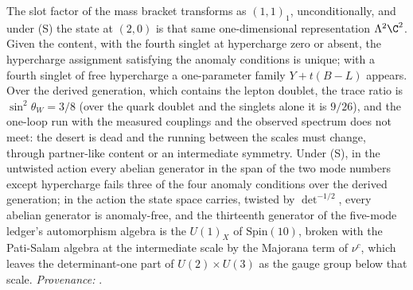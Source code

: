 The slot factor of the mass bracket transforms as $(1,1)_{1}$, unconditionally, and under (S) the state at $(2,0)$ is that same one-dimensional representation $\Lambda^{2}\C^{2}$. Given the content, with the fourth singlet at hypercharge zero or absent, the hypercharge assignment satisfying the anomaly conditions is unique; with a fourth singlet of free hypercharge a one-parameter family $Y + t(B - L)$ appears. Over the derived generation, which contains the lepton doublet, the trace ratio is $\sin^{2}\theta_{W} = 3/8$ (over the quark doublet and the singlets alone it is $9/26$), and the one-loop run with the measured couplings and the observed spectrum does not meet: the desert is dead and the running between the scales must change, through partner-like content or an intermediate symmetry. Under (S), in the untwisted action every abelian generator in the span of the two mode numbers except hypercharge fails three of the four anomaly conditions over the derived generation; in the action the state space carries, twisted by $\det^{-1/2}$, every abelian generator is anomaly-free, and the thirteenth generator of the five-mode ledger's automorphism algebra is the $U(1)_{X}$ of $\mathrm{Spin}(10)$, broken with the Pati-Salam algebra at the intermediate scale by the Majorana term of $\nu^{c}$, which leaves the determinant-one part of $U(2) \times U(3)$ as the gauge group below that scale. \emph{Provenance:} \cite[Prop.~3.2, Prop.~5.8(1), (3), Thm.~5.5(3), Props.~6.1, 6.2, 10.7]{ButlerT12}.
